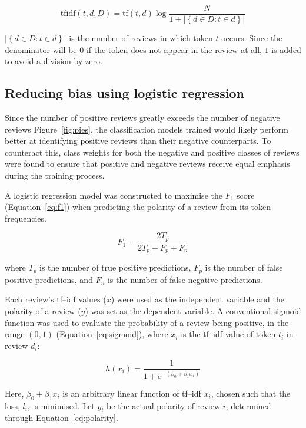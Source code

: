 \documentclass[11pt, a4paper]{pancake-article}
\begin{document}
\begin{equation}
  \text{tfidf}\left(t, d, D\right) = \text{tf}\left(t,
  d\right)\log\frac{N}{1 + \left|\left\{d \in D : t\in d\right\}\right|}
  \label{eq:tf-idf}
\end{equation}

\(\left|\left\{d \in D : t \in d\right\}\right|\) is the number of
reviews in which token \(t\) occurs.
Since the denominator will be \(0\) if the token does not appear in
the review at all, \(1\) is added
to avoid a division-by-zero.

\subsection{Reducing bias using logistic regression}

Since the number of positive reviews greatly exceeds the number of
negative reviews Figure~\ref{fig:pies},
the classification models trained would likely perform better at
identifying positive reviews than their
negative counterparts. To counteract this, class weights for both the
negative and positive classes of reviews
were found to ensure that positive and negative reviews receive equal
emphasis during the training process.

A logistic regression model was constructed to maximise the $F_1$
score (Equation~\ref{eq:f1}) when
predicting the polarity of a review from its token frequencies.

\begin{equation}
  F_1 = \frac{2 T_p}{2 T_p + F_p + F_n}
  \label{eq:f1}
\end{equation}

where $T_p$ is the number of true positive predictions, $F_p$ is the
number of false positive predictions,
and $F_n$ is the number of false negative predictions.

Each review's tf--idf values ($x$) were used as the independent
variable and the polarity of a review ($y$) was set
as the dependent variable. A conventional sigmoid function was used
to evaluate the probability of a review being positive, in the range
\(\left(0, 1\right)\) (Equation~\ref{eq:sigmoid}), where \(x_i\) is
the tf--idf value of token \(t_i\) in
review \(d_i\):

\begin{equation}
  h\left(x_i\right)  = \frac{1}{1 + e^{-\left(\beta_0 + \beta_1 x_i\right)}}
  \label{eq:sigmoid}
\end{equation}

Here, \(\beta_0 + \beta_1 x_i\) is an arbitrary linear function of
tf--idf \(x_i\), chosen
such that the loss, \(l_i\), is minimised. Let \(y_i\) be the actual
polarity of review \(i\),
determined through Equation~\ref{eq:polarity}.
\end{document}

